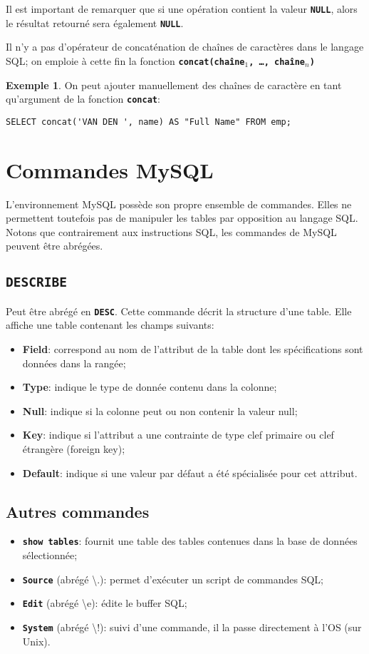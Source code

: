 \documentclass[a4paper, 12pt]{report}
\newcommand{\textSQL}[1]{\texttt{\textbf{#1}}}
\theoremstyle{definition} \newtheorem{ex}{Exemple}
\begin{document}
Il est important de remarquer que si une opération contient la valeur \textSQL{NULL}, alors le résultat retourné sera également \textSQL{NULL}.

Il n'y a pas d'opérateur de concaténation de chaînes de caractères dans le langage SQL; on emploie à cette fin la fonction \textSQL{concat(chaîne$_1$, \ldots, chaîne$_n$)}

\begin{ex}On peut ajouter manuellement des chaînes de caractère en tant qu'argument de la fonction \textSQL{concat}:
\begin{lstlisting}[frame=single]
SELECT concat('VAN DEN ', name) AS "Full Name" FROM emp;
\end{lstlisting}
\end{ex}

\section{Commandes MySQL}
L'environnement MySQL possède son propre ensemble de commandes. Elles ne permettent toutefois pas de manipuler les tables par opposition au langage SQL. Notons que contrairement aux instructions SQL, les commandes de MySQL peuvent être abrégées.
\subsection{\textSQL{DESCRIBE}}
Peut être abrégé en \textSQL{DESC}. Cette commande décrit la structure d'une table. Elle affiche une table contenant les champs suivants:
	\begin{itemize}
		\item \textbf{Field}: correspond au nom de l'attribut de la table dont les spécifications sont données dans la rangée;
		\item \textbf{Type}: indique le type de donnée contenu dans la colonne;
		\item \textbf{Null}: indique si la colonne peut ou non contenir la valeur null;
		\item \textbf{Key}: indique si l'attribut a une contrainte de type clef primaire ou clef étrangère (foreign key);
		\item \textbf{Default}: indique si une valeur par défaut a été spécialisée pour cet attribut.
	\end{itemize}
\subsection{Autres commandes}
\begin{itemize}
		\item \textSQL{show tables}: fournit une table des tables contenues dans la base de données sélectionnée;
		\item \textSQL{Source} (abrégé \textbackslash{}.): permet d'exécuter un script de commandes SQL;
		\item \textSQL{Edit} (abrégé \textbackslash{}e): édite le buffer SQL;
		\item \textSQL{System} (abrégé \textbackslash{}!): suivi d'une commande, il la passe directement à l'OS (sur Unix).
	\end{itemize}
	
\end{document}
